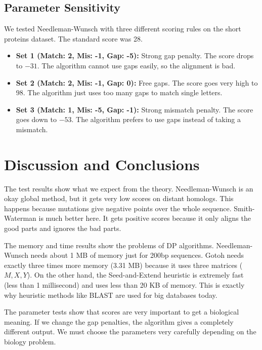 \documentclass[Assignment,MME,english]{twbook}
\begin{document}
\section{Parameter Sensitivity}
We tested Needleman-Wunsch with three different scoring rules on the short proteins dataset. The standard score was 28.
\begin{itemize}
    \item \textbf{Set 1 (Match: 2, Mis: -1, Gap: -5):} Strong gap penalty. The score drops to $-31$. The algorithm cannot use gaps easily, so the alignment is bad.
    \item \textbf{Set 2 (Match: 2, Mis: -1, Gap: 0):} Free gaps. The score goes very high to $98$. The algorithm just uses too many gaps to match single letters.
    \item \textbf{Set 3 (Match: 1, Mis: -5, Gap: -1):} Strong mismatch penalty. The score goes down to $-53$. The algorithm prefers to use gaps instead of taking a mismatch.
\end{itemize}


\chapter{Discussion and Conclusions}
The test results show what we expect from the theory. Needleman-Wunsch is an okay global method, but it gets very low scores on distant homologs. This happens because mutations give negative points over the whole sequence. Smith-Waterman is much better here. It gets positive scores because it only aligns the good parts and ignores the bad parts.

The memory and time results show the problems of DP algorithms. Needleman-Wunsch needs about 1 MB of memory just for 200bp sequences. Gotoh needs exactly three times more memory (3.31 MB) because it uses three matrices ($M, X, Y$). On the other hand, the Seed-and-Extend heuristic is extremely fast (less than 1 millisecond) and uses less than 20 KB of memory. This is exactly why heuristic methods like BLAST are used for big databases today.

The parameter tests show that scores are very important to get a biological meaning. If we change the gap penalties, the algorithm gives a completely different output. We must choose the parameters very carefully depending on the biology problem.

\clearpage
\printbibliography
\clearpage

\listoftables
\clearpage

%
%
\appendix
\end{document}
